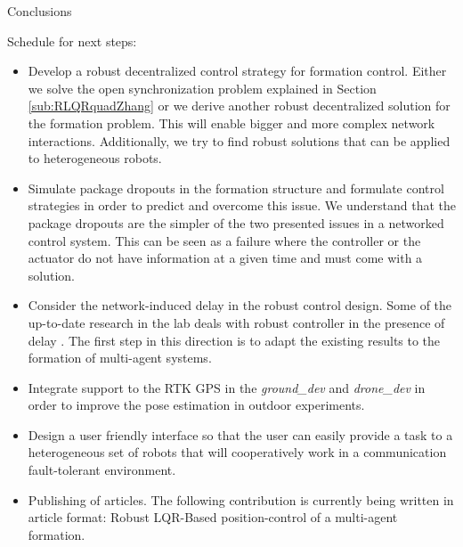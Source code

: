 \begin{frame}{Conclusions}

Schedule for next steps:

\begin{itemize}
	\item Develop a robust decentralized control strategy for formation control. Either we solve the open synchronization problem explained in Section \ref{sub:RLQRquadZhang} or we derive another robust decentralized solution for the formation problem. This will enable bigger and more complex network interactions. Additionally, we try to find robust solutions that can be applied to heterogeneous robots.
	\item Simulate package dropouts in the formation structure and formulate control strategies in order to predict and overcome this issue. We understand that the package dropouts are the simpler of the two presented issues in a networked control system. This can be seen as a failure where the controller or the actuator do not have information at a given time and must come with a solution.
	\item Consider the network-induced delay in the robust control design. Some of the up-to-date research in the lab deals with robust controller in the presence of delay \cite{Daiane2018,Daiane2018art2}. The first step in this direction is to adapt the existing results to the formation of multi-agent systems.
	\item Integrate support to the RTK GPS in the \textit{ground\_dev} and \textit{drone\_dev} in order to improve the pose estimation in outdoor experiments.
	\item Design a user friendly interface so that the user can easily provide a task to a heterogeneous set of robots that will cooperatively work in a communication fault-tolerant environment.
	\item Publishing of articles. The following contribution is currently being written in article format: Robust LQR-Based position-control of a multi-agent formation.
\end{itemize}

\end{frame}